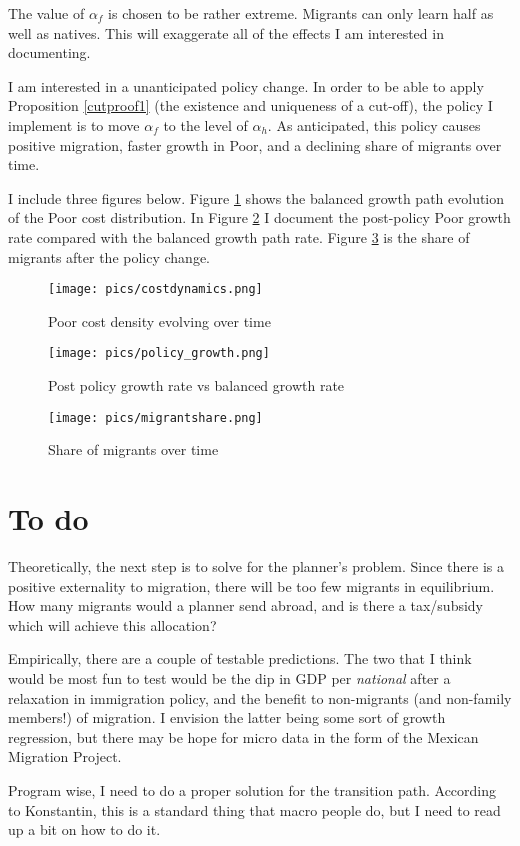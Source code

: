 \documentclass[12pt]{article}
\begin{document}
The value of $\alpha_f$ is chosen to be rather extreme.  Migrants can only learn half as well as natives.  This will exaggerate all of the effects I am interested in documenting.

I am interested in a unanticipated policy change.  In order to be able to apply Proposition \ref{cutproof1} (the existence and uniqueness of a cut-off), the policy I implement is to move $\alpha_f$ to the level of $\alpha_h$. As anticipated, this policy causes positive migration, faster growth in Poor, and a declining share of migrants over time.

I include three figures below.  Figure \ref{fig:costdynamics} shows the balanced growth path evolution of the Poor cost distribution.  In Figure \ref{fig:policy_growth}  I document the post-policy Poor growth rate compared with the balanced growth path rate.  Figure \ref{fig:migrantshare} is the share of migrants after the policy change.

\begin{figure}
    \texttt{[image: pics/costdynamics.png]}
    \label{fig:costdynamics}
    \caption{Poor cost density evolving over time}
\end{figure}
\begin{figure}
    \texttt{[image: pics/policy\_growth.png]}
    \label{fig:policy_growth}
    \caption{Post policy growth rate vs balanced growth rate}
\end{figure}
\begin{figure}
    \texttt{[image: pics/migrantshare.png]}
    \label{fig:migrantshare}
    \caption{Share of migrants over time}
\end{figure}

\section{To do}

Theoretically, the next step is to solve for the planner's problem.  Since there is a positive externality to migration, there will be too few migrants in equilibrium.  How many migrants would a planner send abroad, and is there a tax/subsidy which will achieve this allocation?

Empirically, there are a couple of testable predictions.  The two that I think would be most fun to test would be the dip in GDP per \emph{national} after a relaxation in immigration policy, and the benefit to non-migrants (and non-family members!) of migration.  I envision the latter being some sort of growth regression, but there may be hope for micro data in the form of the Mexican Migration Project.

Program wise, I need to do a proper solution for the transition path.  According to Konstantin, this is a standard thing that macro people do, but I need to read up a bit on how to do it.



\end{document}
